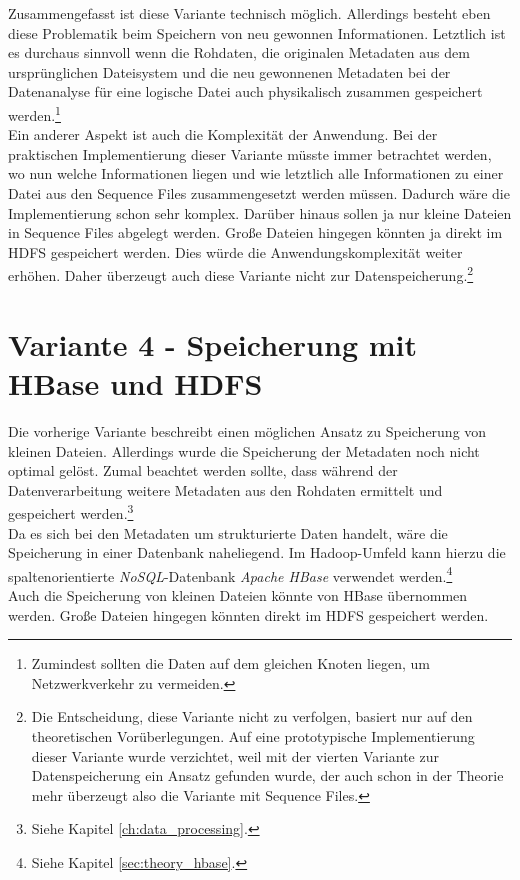 \noindent
Zusammengefasst ist diese Variante technisch möglich. Allerdings besteht eben diese Problematik beim Speichern von neu gewonnen Informationen. Letztlich ist es durchaus sinnvoll wenn die Rohdaten, die originalen Metadaten aus dem ursprünglichen Dateisystem und die neu gewonnenen Metadaten bei der Datenanalyse für eine logische Datei auch physikalisch zusammen gespeichert werden.\footnote{Zumindest sollten die Daten auf dem gleichen Knoten liegen, um Netzwerkverkehr zu vermeiden.}\\ 
Ein anderer Aspekt ist auch die Komplexität der Anwendung. Bei der praktischen Implementierung dieser Variante müsste immer betrachtet werden, wo nun welche Informationen liegen und wie letztlich alle Informationen zu einer Datei aus den Sequence Files zusammengesetzt werden müssen. Dadurch wäre die Implementierung schon sehr komplex. Darüber hinaus sollen ja nur kleine Dateien in Sequence Files abgelegt werden. Große Dateien hingegen könnten ja direkt im HDFS gespeichert werden. Dies würde die Anwendungskomplexität weiter erhöhen. Daher überzeugt auch diese Variante nicht zur Datenspeicherung.\footnote{Die Entscheidung, diese Variante nicht zu verfolgen, basiert nur auf den theoretischen Vorüberlegungen. Auf eine prototypische Implementierung dieser Variante wurde verzichtet, weil mit der vierten Variante zur Datenspeicherung ein Ansatz gefunden wurde, der auch schon in der Theorie mehr überzeugt also die Variante mit Sequence Files.}

\section{Variante 4 - Speicherung mit HBase und HDFS}
Die vorherige Variante beschreibt einen möglichen Ansatz zu Speicherung von kleinen Dateien. Allerdings wurde die Speicherung der Metadaten noch nicht optimal gelöst. Zumal beachtet werden sollte, dass während der Datenverarbeitung weitere Metadaten aus den Rohdaten ermittelt und gespeichert werden.\footnote{Siehe Kapitel \ref{ch:data_processing}.}\\
Da es sich bei den Metadaten um strukturierte Daten handelt, wäre die Speicherung in einer Datenbank naheliegend. Im Hadoop-Umfeld kann hierzu die spaltenorientierte \textit{NoSQL}-Datenbank \textit{Apache HBase} verwendet werden.\footnote{Siehe Kapitel \ref{sec:theory_hbase}.}\\
Auch die Speicherung von kleinen Dateien könnte von HBase übernommen werden. Große Dateien hingegen könnten direkt im HDFS gespeichert werden. 

